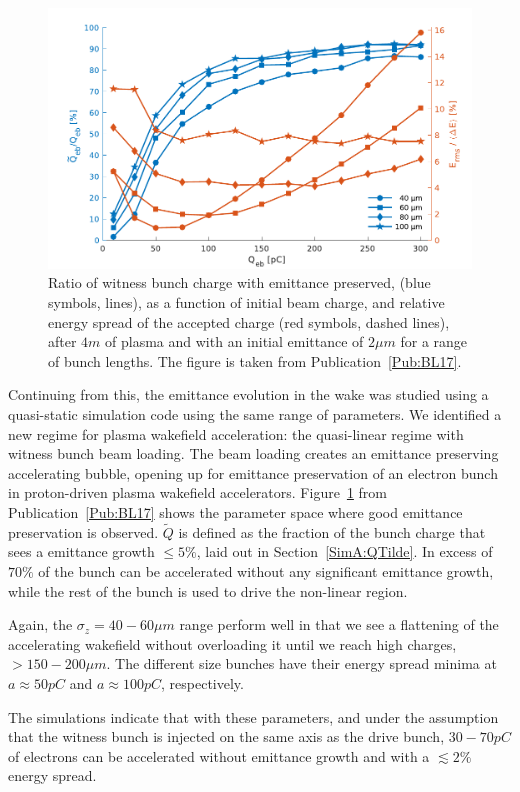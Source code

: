 \begin{figure}[hbt]
    \centering
    \includegraphics[width=0.8125\linewidth]{figures/BeamQuality}
    \caption{\label{Fig:Sum:BQ}
        Ratio of witness bunch charge with emittance preserved, (blue symbols, lines), as a function of initial beam charge, and relative energy spread of the accepted charge (red symbols, dashed lines), after $4\unit{m}$ of plasma and with an initial emittance of $2\unit{\mu m}$ for a range of bunch lengths.
        The figure is taken from Publication~\ref{Pub:BL17}.
    }
\end{figure}

Continuing from this, the emittance evolution in the wake was studied using a quasi-static simulation code using the same range of parameters.
We identified a new regime for plasma wakefield acceleration: the quasi-linear regime with witness bunch beam loading.
The beam loading creates an emittance preserving accelerating bubble, opening up for emittance preservation of an electron bunch in proton-driven plasma wakefield accelerators.
Figure~\ref{Fig:Sum:BQ} from Publication~\ref{Pub:BL17} shows the parameter space where good emittance preservation is observed.
$\tilde{Q}$ is defined as the fraction of the bunch charge that sees a emittance growth $\leq 5\%$, laid out in Section~\ref{SimA:QTilde}.
In excess of $70\%$ of the bunch can be accelerated without any significant emittance growth, while the rest of the bunch is used to drive the non-linear region.

Again, the $\sigma_z = 40-60\unit{\mu m}$ range perform well in that we see a flattening of the accelerating wakefield without overloading it until we reach high charges, $> 150-200\unit{\mu m}$.
The different size bunches have their energy spread minima at $a\approx 50\unit{pC}$ and $a\approx 100\unit{pC}$, respectively.

The simulations indicate that with these parameters, and under the assumption that the witness bunch is injected on the same axis as the drive bunch, $30-70\unit{pC}$ of electrons can be accelerated without emittance growth and with a $\lesssim 2\%$ energy spread.

